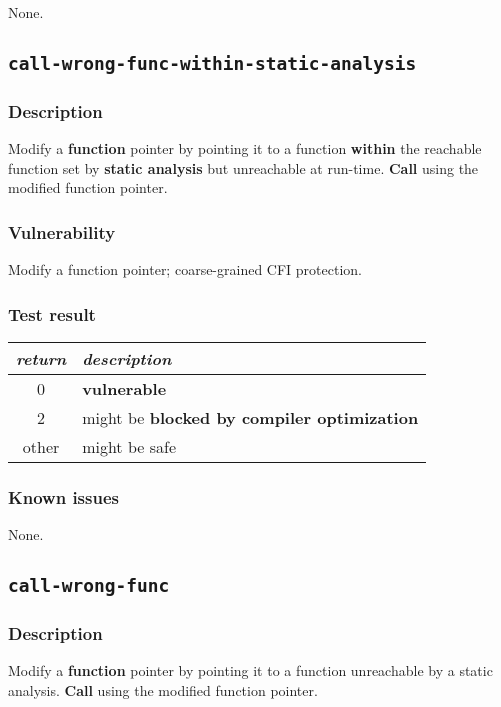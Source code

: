 \documentclass[a4paper]{book}
\begin{document}
None.

\newpage

\subsection{\texttt{call-wrong-func-within-static-analysis}}\label{test-call-wrong-func-within-static-analysis}

\subsubsection{Description}
Modify a \textbf{function} pointer by pointing it to a function \textbf{within} the reachable function set by \textbf{static analysis} but unreachable at run-time.
\textbf{Call} using the modified function pointer.

\subsubsection{Vulnerability}
Modify a function pointer; coarse-grained CFI protection.

\subsubsection{Test result}
\begin{tabular}{cl}
  \toprule
  \emph{return}  & \emph{description} \\
  \midrule
  0              & \textbf{vulnerable} \\
  2              & might be \textbf{blocked by compiler optimization} \\
  other          & might be safe \\
  \bottomrule
\end{tabular}
  
\subsubsection{Known issues}

None.

\newpage

\subsection{\texttt{call-wrong-func}}\label{test-call-wrong-func}

\subsubsection{Description}
Modify a \textbf{function} pointer by pointing it to a function unreachable by a static analysis.
\textbf{Call} using the modified function pointer.
\end{document}
